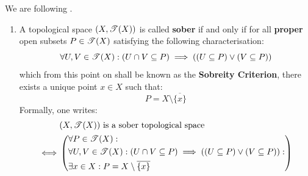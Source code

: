                     \begin{definition} \label{def: sober_spaces}
                        We are following \cite[Definition IX.3.2]{sheaves_in_geometry_and_logic}.
                        \begin{enumerate}
                            \item A topological space $(X, \mathscr{T}(X))$ is called \textbf{sober} if and only if for all \textbf{proper} open subsets $P \in \mathscr{T}(X)$ satisfying the following  characterisation:
                                $$\forall U, V \in \mathscr{T}(X): (U \cap V \subseteq P) \implies \left((U \subseteq P) \vee (V \subseteq P)\right)$$
                            which from this point on shall be known as the \textbf{Sobreity Criterion}, there exists a unique point $x \in X$ such that:
                                $$P = X \setminus \overline{\{x\}}$$
                            Formally, one writes:
                                $$
                                    \begin{aligned}
                                        & \text{$(X, \mathscr{T}(X))$ is a sober topological space}
                                        \\
                                        \iff &
                                            \left(\begin{aligned}
                                                & \forall P \in \mathscr{T}(X):
                                                \\
                                                    & \forall U, V \in \mathscr{T}(X): (U \cap V \subseteq P) \implies \left((U \subseteq P) \vee (V \subseteq P)\right): 
                                                \\
                                                & \exists x \in X: P = X \setminus \overline{\{x\}}
                                            \end{aligned}\right)
                                    \end{aligned}
                                $$
                        \end{enumerate}
                    \end{definition}
                    
